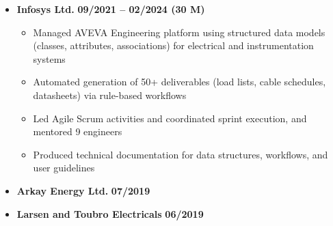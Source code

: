 \documentclass[14pt]{extreport}
\begin{document}
{\begin{itemize}[itemsep=4pt,parsep=0pt,topsep=2pt]
        \item \textbf{\color{primarycolor} Infosys Ltd.} \hfill \textbf{09/2021 -- 02/2024 (30 M)}
        \begin{itemize}[itemsep=0pt,parsep=0pt,topsep=1pt]
            \footnotesize
            \item Managed AVEVA Engineering platform using structured data models (classes, attributes, associations) for electrical and instrumentation systems
            \item Automated generation of 50+ deliverables (load lists, cable schedules, datasheets) via rule-based workflows
            \item Led Agile Scrum activities and coordinated sprint execution, and mentored 9 engineers
            \item Produced technical documentation for data structures, workflows, and user guidelines
        \end{itemize}
        \item \textbf{\color{primarycolor} Arkay Energy Ltd.} \hfill \textbf{07/2019}

        \item \textbf{\color{primarycolor} Larsen and Toubro Electricals} \hfill \textbf{06/2019}
    \end{itemize}
}
\end{document}
